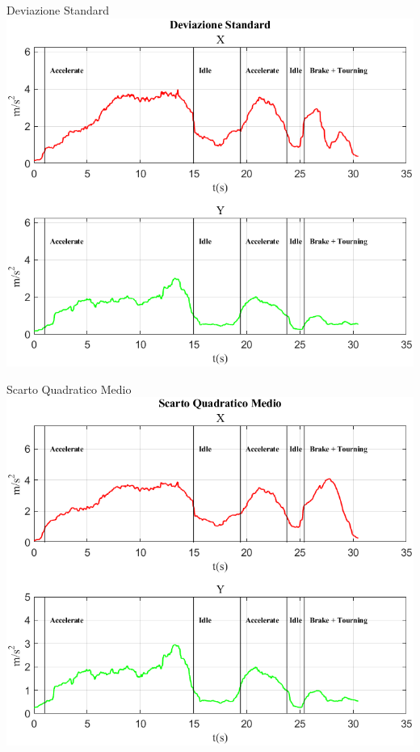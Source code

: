 \documentclass[beamer]{standalone}
\begin{document}
	\begin{frame}{{Deviazione Standard}}
		\centering\includegraphics[height=.8\textheight]{figure/Acc/Deviazione Standard}
	\end{frame}
	
	\begin{frame}{{Scarto Quadratico Medio}}
		\centering\includegraphics[height=.8\textheight]{figure/Acc/Scarto Quadratico Medio}
	\end{frame}
	
\end{document}

